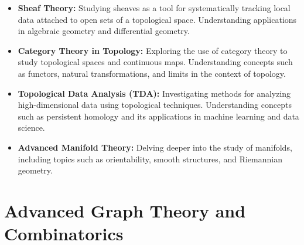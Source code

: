 \documentclass[openany]{book}
\begin{document}
\begin{itemize}
    \item \textbf{Sheaf Theory:} Studying sheaves as a tool for systematically tracking local data attached to open sets of a topological space. Understanding applications in algebraic geometry and differential geometry.
    \item \textbf{Category Theory in Topology:} Exploring the use of category theory to study topological spaces and continuous maps. Understanding concepts such as functors, natural transformations, and limits in the context of topology.
    \item \textbf{Topological Data Analysis (TDA):} Investigating methods for analyzing high-dimensional data using topological techniques. Understanding concepts such as persistent homology and its applications in machine learning and data science.
    \item \textbf{Advanced Manifold Theory:} Delving deeper into the study of manifolds, including topics such as orientability, smooth structures, and Riemannian geometry.
\end{itemize}
\section{Advanced Graph Theory and Combinatorics}
\end{document}
